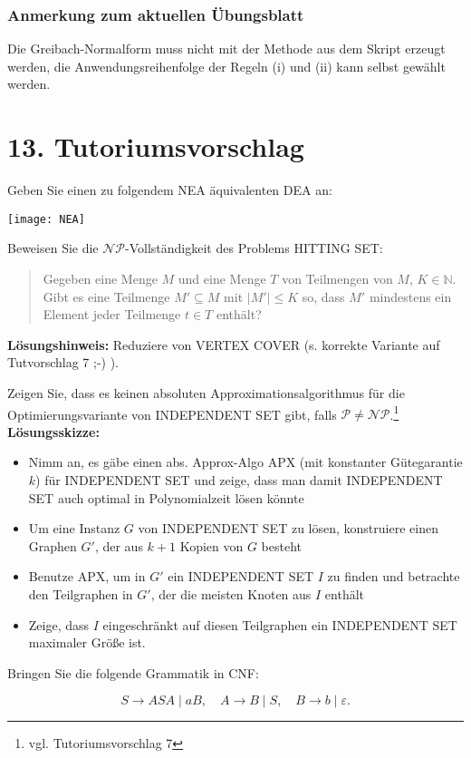 \begin{frame}
 \frametitle{Anmerkung zum aktuellen Übungsblatt}
 Die Greibach-Normalform muss nicht mit der Methode aus dem Skript erzeugt werden,
 die Anwendungsreihenfolge der Regeln (i) und (ii) kann selbst gewählt werden.
\end{frame}

\section{13. Tutoriumsvorschlag}
\begin{frame}
Geben Sie einen zu folgendem NEA äquivalenten DEA an:

\begin{center}
 \texttt{[image: NEA]}
\end{center}
\end{frame}

\begin{frame}
Beweisen Sie die $\mathcal{NP}$-Vollständigkeit des Problems HITTING SET:
\begin{quote}
  Gegeben eine Menge $M$ und eine Menge $T$ von Teilmengen von $M$,
  $K \in \mathbb{N}$. Gibt es eine Teilmenge $M' \subseteq M$ mit $|M'| \leq K$ so,
  dass $M'$ mindestens ein Element jeder Teilmenge $t \in T$ enthält?
\end{quote}
\textbf{Lösungshinweis:}
 Reduziere von VERTEX COVER (s. korrekte Variante auf Tutvorschlag 7 ;-) ).
\end{frame}

\begin{frame}
Zeigen Sie, dass es keinen absoluten Approximationsalgorithmus für die Optimierungsvariante von
INDEPENDENT SET gibt, falls $\mathcal{P} \neq \mathcal{NP}$.\footnote{vgl. Tutoriumsvorschlag 7}
\textbf{Lösungsskizze:}
\begin{itemize}
 \item Nimm an, es gäbe einen abs. Approx-Algo APX (mit konstanter Gütegarantie $k$) für INDEPENDENT SET und zeige, dass man damit INDEPENDENT SET auch optimal in Polynomialzeit lösen könnte
 \item Um eine Instanz $G$ von INDEPENDENT SET zu lösen, konstruiere einen Graphen $G'$, der aus $k+1$ Kopien von $G$ besteht
 \item Benutze APX, um in $G'$ ein INDEPENDENT SET $I$ zu finden und betrachte den Teilgraphen in $G'$, der die meisten Knoten aus $I$ enthält
 \item Zeige, dass $I$ eingeschränkt auf diesen Teilgraphen ein INDEPENDENT SET maximaler Größe ist. 
\end{itemize}
\end{frame}

\begin{frame}
Bringen Sie die folgende Grammatik in CNF:

$$S \rightarrow ASA \mid aB, \quad A \rightarrow B \mid S, \quad
B \rightarrow b \mid \varepsilon.$$
\end{frame}


